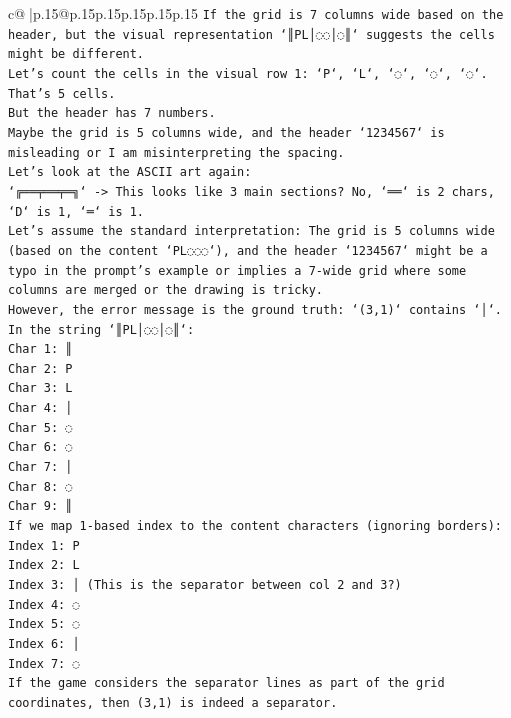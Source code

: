 \documentclass{article}
\begin{document}
{\begin{supertabular}{c@{$\;$}|p{.15\linewidth}@{}p{.15\linewidth}p{.15\linewidth}p{.15\linewidth}p{.15\linewidth}p{.15\linewidth}}
{{{\texttt{If the grid is 7 columns wide based on the header, but the visual representation `║PL│◌◌│◌║` suggests the cells might be different.} \\
\texttt{Let's count the cells in the visual row 1: `P`, `L`, `◌`, `◌`, `◌`. That's 5 cells.} \\
\texttt{But the header has 7 numbers.} \\
\texttt{Maybe the grid is 5 columns wide, and the header `1234567` is misleading or I am misinterpreting the spacing.} \\
\texttt{Let's look at the ASCII art again:} \\
\texttt{`╔══╤══╤═╗` {-}> This looks like 3 main sections? No, `══` is 2 chars, `D` is 1, `═` is 1.} \\
\texttt{Let's assume the standard interpretation: The grid is 5 columns wide (based on the content `PL◌◌◌`), and the header `1234567` might be a typo in the prompt's example or implies a 7{-}wide grid where some columns are merged or the drawing is tricky.} \\
\texttt{However, the error message is the ground truth: `(3,1)` contains `│`.} \\
\texttt{In the string `║PL│◌◌│◌║`:} \\
\texttt{Char 1: ║} \\
\texttt{Char 2: P} \\
\texttt{Char 3: L} \\
\texttt{Char 4: │} \\
\texttt{Char 5: ◌} \\
\texttt{Char 6: ◌} \\
\texttt{Char 7: │} \\
\texttt{Char 8: ◌} \\
\texttt{Char 9: ║} \\
\texttt{If we map 1{-}based index to the content characters (ignoring borders):} \\
\texttt{Index 1: P} \\
\texttt{Index 2: L} \\
\texttt{Index 3: │ (This is the separator between col 2 and 3?)} \\
\texttt{Index 4: ◌} \\
\texttt{Index 5: ◌} \\
\texttt{Index 6: │} \\
\texttt{Index 7: ◌} \\
\texttt{If the game considers the separator lines as part of the grid coordinates, then (3,1) is indeed a separator.} \\
}}}
\end{supertabular}}
\end{document}
